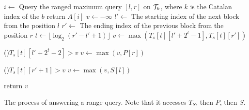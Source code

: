 \begin{algorithm}
\SetAlgoNoLine
{}

 {
  $i \gets$ Query the ranged maximum query $[l, r]$ on ${\cal T}_{k}$, where $k$ is the Catalan index of the $b$  \;
  return $A[i]$ \;
}
$v \gets - \infty$ \;
$l' \gets$ The starting index of the next block from the position $l$ \;
$r' \gets$ The ending index of the previous block from the position $r$ \;
$t \gets \lfloor \log_2 (r' - l' + 1) \rfloor$ \;
 {
  $v \gets \max(T_s[t][l' + 2^t - 1], T_s[t][r'])$ \;
}

\If(){$T_s[t][l' + 2^t - 2] > v$} {
  $v \gets \max(v, P[r])$ \;
}

\If(){$T_s[t][r' + 1] > v$} {
  $v \gets \max(v, S[l])$ \;
}

return $v$ \;

\caption{The process of answering a range query. Note that it accesses
  $T_S$, then $P$, then $S$.}
\label{alg:rmq-access-order-2e}
\end{algorithm}
